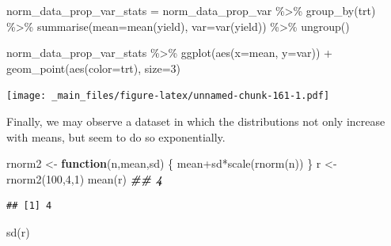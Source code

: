 \documentclass[
]{book}
\newenvironment{Shaded}{\begin{snugshade}}{\end{snugshade}}
\newcommand{\AttributeTok}[1]{\textcolor[rgb]{0.77,0.63,0.00}{#1}}
\newcommand{\ControlFlowTok}[1]{\textcolor[rgb]{0.13,0.29,0.53}{\textbf{#1}}}
\newcommand{\DecValTok}[1]{\textcolor[rgb]{0.00,0.00,0.81}{#1}}
\newcommand{\DocumentationTok}[1]{\textcolor[rgb]{0.56,0.35,0.01}{\textbf{\textit{#1}}}}
\newcommand{\FunctionTok}[1]{\textcolor[rgb]{0.00,0.00,0.00}{#1}}
\newcommand{\NormalTok}[1]{#1}
\newcommand{\OtherTok}[1]{\textcolor[rgb]{0.56,0.35,0.01}{#1}}
\newcommand{\SpecialCharTok}[1]{\textcolor[rgb]{0.00,0.00,0.00}{#1}}
\begin{document}
\begin{Shaded}
\begin{Highlighting}[]
\NormalTok{norm\_data\_prop\_var\_stats }\OtherTok{=}\NormalTok{ norm\_data\_prop\_var }\SpecialCharTok{\%\textgreater{}\%}
        \FunctionTok{group\_by}\NormalTok{(trt) }\SpecialCharTok{\%\textgreater{}\%}
        \FunctionTok{summarise}\NormalTok{(}\AttributeTok{mean=}\FunctionTok{mean}\NormalTok{(yield),}
                \AttributeTok{var=}\FunctionTok{var}\NormalTok{(yield)) }\SpecialCharTok{\%\textgreater{}\%}
        \FunctionTok{ungroup}\NormalTok{()}

\NormalTok{norm\_data\_prop\_var\_stats }\SpecialCharTok{\%\textgreater{}\%}
  \FunctionTok{ggplot}\NormalTok{(}\FunctionTok{aes}\NormalTok{(}\AttributeTok{x=}\NormalTok{mean, }\AttributeTok{y=}\NormalTok{var)) }\SpecialCharTok{+}
        \FunctionTok{geom\_point}\NormalTok{(}\FunctionTok{aes}\NormalTok{(}\AttributeTok{color=}\NormalTok{trt), }\AttributeTok{size=}\DecValTok{3}\NormalTok{)}
\end{Highlighting}
\end{Shaded}

\texttt{[image: \_main\_files/figure-latex/unnamed-chunk-161-1.pdf]}

Finally, we may observe a dataset in which the distributions not only increase with means, but seem to do so exponentially.

\begin{Shaded}
\begin{Highlighting}[]
\NormalTok{rnorm2 }\OtherTok{\textless{}{-}} \ControlFlowTok{function}\NormalTok{(n,mean,sd) \{ mean}\SpecialCharTok{+}\NormalTok{sd}\SpecialCharTok{*}\FunctionTok{scale}\NormalTok{(}\FunctionTok{rnorm}\NormalTok{(n)) \}}
\NormalTok{r }\OtherTok{\textless{}{-}} \FunctionTok{rnorm2}\NormalTok{(}\DecValTok{100}\NormalTok{,}\DecValTok{4}\NormalTok{,}\DecValTok{1}\NormalTok{)}
\FunctionTok{mean}\NormalTok{(r)  }\DocumentationTok{\#\# 4}
\end{Highlighting}
\end{Shaded}

\begin{verbatim}
## [1] 4
\end{verbatim}

\begin{Shaded}
\begin{Highlighting}[]
\FunctionTok{sd}\NormalTok{(r)}
\end{Highlighting}
\end{Shaded}
\end{document}
